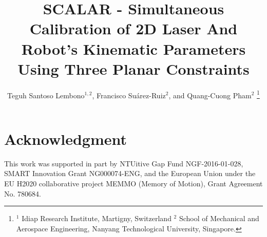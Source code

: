 \documentclass[letterpaper, 10 pt, conference]{ieeeconf}
\title{\LARGE
  \textbf{SCALAR - Simultaneous Calibration of 2D Laser And Robot's Kinematic Parameters Using Three Planar Constraints}}
\author{Teguh Santoso Lembono$^{1,2}$, Francisco Su\'{a}rez-Ruiz$^{2}$, and Quang-Cuong Pham$^{2}$%
  \thanks{$^1$ Idiap Research Institute, Martigny, Switzerland \quad $^2$ School of Mechanical and Aerospace
          Engineering, Nanyang Technological University, Singapore.}}
\begin{document}
\maketitle
\thispagestyle{empty}
\pagestyle{empty}








\section*{Acknowledgment}
This work was supported in part by NTUitive Gap Fund NGF-2016-01-028, SMART Innovation Grant NG000074-ENG, and the European Union under the EU H2020 collaborative project MEMMO (Memory of Motion), Grant Agreement No. 780684.




\end{document}
